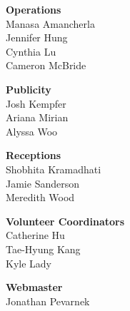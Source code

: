 \documentclass[twoside]{article}
\begin{document}
\begin{multicols}{2}
\begin{minipage}{\columnwidth}
\end{minipage}
    \begin{minipage}{\columnwidth}
    {\bf Operations}\\
    Manasa Amancherla\\
    Jennifer Hung\\
    Cynthia Lu\\
    Cameron McBride\\
    
\end{minipage}
    \begin{minipage}{\columnwidth}
    {\bf Publicity}\\
    Josh Kempfer\\
    Ariana Mirian\\
    Alyssa Woo\\
    
\end{minipage}
    \begin{minipage}{\columnwidth}
    {\bf Receptions}\\
    Shobhita Kramadhati\\
    Jamie Sanderson\\
    Meredith Wood\\
    
\end{minipage}
    \begin{minipage}{\columnwidth}
    {\bf Volunteer Coordinators}\\
    Catherine Hu\\
    Tae-Hyung Kang\\
    Kyle Lady\\
    
\end{minipage}
    \begin{minipage}{\columnwidth}
    {\bf Webmaster}\\
    Jonathan Pevarnek\\
    

\end{minipage}
\end{multicols}
\end{document}

